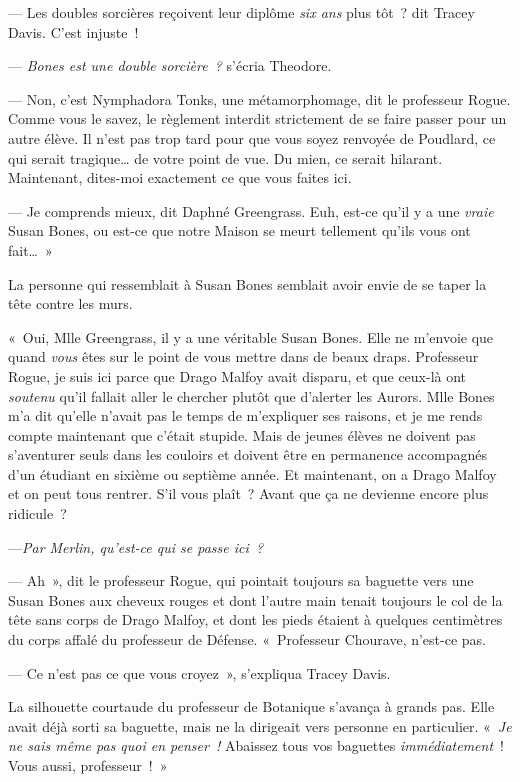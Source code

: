 --- Les doubles sorcières reçoivent leur diplôme \emph{six ans} plus tôt~? dit Tracey Davis. C'est injuste~!

--- \emph{Bones est une double sorcière~?} s'écria Theodore.

--- Non, c'est Nymphadora Tonks, une métamorphomage, dit le professeur Rogue. Comme vous le savez, le règlement interdit strictement de se faire passer pour un autre élève. Il n'est pas trop tard pour que vous soyez renvoyée de Poudlard, ce qui serait tragique… de votre point de vue. Du mien, ce serait hilarant. Maintenant, dites-moi exactement ce que vous faites ici.

--- Je comprends mieux, dit Daphné Greengrass. Euh, est-ce qu'il y a une \emph{vraie} Susan Bones, ou est-ce que notre Maison se meurt tellement qu'ils vous ont fait…~»

La personne qui ressemblait à Susan Bones semblait avoir envie de se taper la tête contre les murs.

«~Oui, Mlle Greengrass, il y a une véritable Susan Bones. Elle ne m'envoie que quand \emph{vous} êtes sur le point de vous mettre dans de beaux draps. Professeur Rogue, je suis ici parce que Drago Malfoy avait disparu, et que ceux-là ont \emph{soutenu} qu'il fallait aller le chercher plutôt que d'alerter les Aurors. Mlle Bones m'a dit qu'elle n'avait pas le temps de m'expliquer ses raisons, et je me rends compte maintenant que c'était stupide. Mais de jeunes élèves ne doivent pas s'aventurer seuls dans les couloirs et doivent être en permanence accompagnés d'un étudiant en sixième ou septième année. Et maintenant, on a Drago Malfoy et on peut tous rentrer. S'il vous plaît~? Avant que ça ne devienne encore plus ridicule~?

---\emph{Par Merlin, qu'est-ce qui se passe ici~?}

--- Ah~», dit le professeur Rogue, qui pointait toujours sa baguette vers une Susan Bones aux cheveux rouges et dont l'autre main tenait toujours le col de la tête sans corps de Drago Malfoy, et dont les pieds étaient à quelques centimètres du corps affalé du professeur de Défense. «~Professeur Chourave, n'est-ce pas.

--- Ce n'est pas ce que vous croyez~», s'expliqua Tracey Davis.

La silhouette courtaude du professeur de Botanique s'avança à grands pas. Elle avait déjà sorti sa baguette, mais ne la dirigeait vers personne en particulier. «~\emph{Je ne sais même pas quoi en penser~!} Abaissez tous vos baguettes \emph{immédiatement}~! Vous aussi, professeur~!~»

